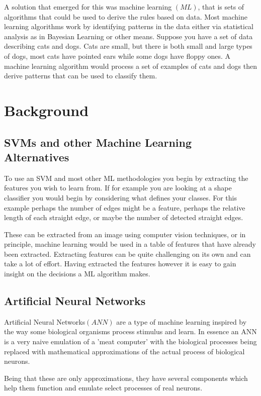 A solution that emerged for this was machine learning $\left(ML\right)$, that is sets of algorithms that could be used to derive the rules based on data. Most machine learning algorithms work by identifying patterns in the data either via statistical analysis as in Bayesian Learning or other means. Suppose you have a set of data describing cats and dogs. Cats are small, but there is both small and large types of dogs, most cats have pointed ears while some dogs have floppy ones. A machine learning algorithm would process a set of examples of cats and dogs then derive patterns that can be used to classify them.

\section{Background}
\subsection{SVMs and other Machine Learning Alternatives}
To use an SVM and most other ML methodologies you begin by extracting the features you wish to learn from. If for example you are looking at a shape classifier you would begin by considering what defines your classes. For this example perhaps the number of edges might be a feature, perhaps the relative length of each straight edge, or maybe the number of detected straight edges.

These can be extracted from an image using computer vision techniques, or in principle, machine learning would be used in a table of features that have already been extracted. Extracting features can be quite challenging on its own and can take a lot of effort. Having extracted the features however it is easy to gain insight on the decisions a ML algorithm makes.

\subsection {Artificial Neural Networks}
Artificial Neural Networks$\left(ANN\right)$ are a type of machine learning inspired by the way some biological organisms process stimulus and learn. In essence an ANN is a very naive emulation of a 'meat computer' with the biological processes being replaced with mathematical approximations of the actual process of biological neurons.

Being that these are only approximations, they have several components which help them function and emulate select processes of real neurons.

